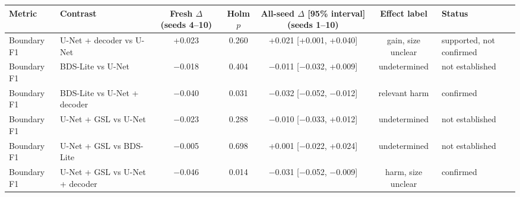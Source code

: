 \begin{tabular}{llccccl}
\toprule
Metric & Contrast & Fresh $\Delta$ (seeds 4--10) & Holm $p$ & All-seed $\Delta$ [95\% interval] (seeds 1--10) & Effect label & Status \\
\midrule
Boundary F1 & U-Net + decoder vs U-Net & +0.023 & 0.260 & +0.021 [+0.001, +0.040] & gain, size unclear & supported, not confirmed \\
Boundary F1 & BDS-Lite vs U-Net & $-$0.018 & 0.404 & $-$0.011 [$-$0.032, +0.009] & undetermined & not established \\
Boundary F1 & BDS-Lite vs U-Net + decoder & $-$0.040 & 0.031 & $-$0.032 [$-$0.052, $-$0.012] & relevant harm & confirmed \\
Boundary F1 & U-Net + GSL vs U-Net & $-$0.023 & 0.288 & $-$0.010 [$-$0.033, +0.012] & undetermined & not established \\
Boundary F1 & U-Net + GSL vs BDS-Lite & $-$0.005 & 0.698 & +0.001 [$-$0.022, +0.024] & undetermined & not established \\
Boundary F1 & U-Net + GSL vs U-Net + decoder & $-$0.046 & 0.014 & $-$0.031 [$-$0.052, $-$0.009] & harm, size unclear & confirmed \\
\bottomrule
\end{tabular}
